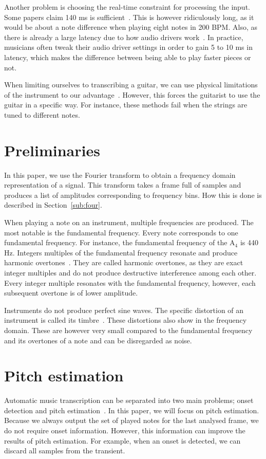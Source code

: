 \documentclass[10pt,twocolumn]{article}
\begin{document}
Another problem is choosing the real-time constraint for processing the input. Some papers claim 140 ms is sufficient~\cite{sloomboi}. This is however ridiculously long, as it would be about a note difference when playing eight notes in 200 BPM. Also, as there is already a large latency due to how audio drivers work~\cite{os}. In practice, musicians often tweak their audio driver settings in order to gain 5 to 10 ms in latency, which makes the difference between being able to play faster pieces or not.

When limiting ourselves to transcribing a guitar, we can use physical limitations of the instrument to our advantage~\cite{physical}. However, this forces the guitarist to use the guitar in a specific way. For instance, these methods fail when the strings are tuned to different notes.


\section{Preliminaries}
In this paper, we use the Fourier transform to obtain a frequency domain representation of a signal. This transform takes a frame full of samples and produces a list of amplitudes corresponding to frequency bins. How this is done is described in Section~\ref{sub:four}.

When playing a note on an instrument, multiple frequencies are produced. The most notable is the fundamental frequency. Every note corresponds to one fundamental frequency. For instance, the fundamental frequency of the $\text{A}_4$ is 440 Hz. Integers multiples of the fundamental frequency resonate and produce harmonic overtones~\cite{overtones}. They are called harmonic overtones, as they are exact integer multiples and do not produce destructive interference among each other. Every integer multiple resonates with the fundamental frequency, however, each subsequent overtone is of lower amplitude.

Instruments do not produce perfect sine waves. The specific distortion of an instrument is called its timbre~\cite{timbre}. These distortions also show in the frequency domain. These are however very small compared to the fundamental frequency and its overtones of a note and can be disregarded as noise.


\section{Pitch estimation}
Automatic music transcription can be separated into two main problems; onset detection and pitch estimation~\cite{survey2}. In this paper, we will focus on pitch estimation. Because we always output the set of played notes for the last analysed frame, we do not require onset information. However, this information can improve the results of pitch estimation. For example, when an onset is detected, we can discard all samples from the transient.
\end{document}
